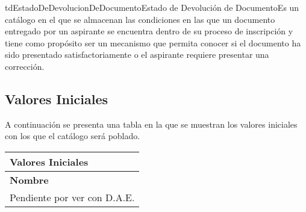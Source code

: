 \begin{TipoDeDato}{tdEstadoDeDevolucionDeDocumento}{Estado de Devolución de Documento}{Es un catálogo en el que se almacenan las condiciones en las que un documento entregado por un aspirante se encuentra dentro de su proceso de inscripción y tiene como propósito ser un mecanismo que permita conocer si el documento ha sido presentado satisfactoriamente o el aspirante requiere presentar una corrección.}

	\begin{tdAtributos}
	\end{tdAtributos}

	\subsection{Valores Iniciales}
	
	A continuación se presenta una tabla en la que se muestran los valores iniciales con los que el catálogo será poblado. \cdtEmpty
		\begin{longtable}{|p{}|}
				\hline
				\rowcolor{colorPrincipal}
	 			\bf \color{white} Valores Iniciales\\
	 			\hline
	 			\rowcolor{colorSecundario}
	 			\bf\color{white}Nombre\\
	 			\hline
	 				\TODO Pendiente por ver con D.A.E.\\
	 			\hline
		\end{longtable}
	
\end{TipoDeDato}